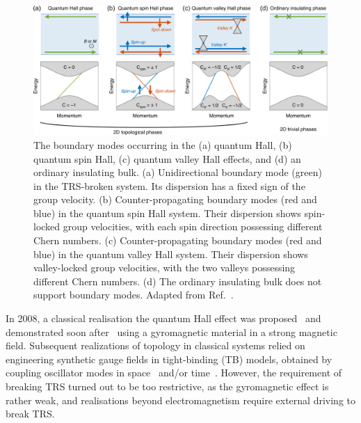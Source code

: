 \begin{figure} [h!]
	\centering
	\includegraphics[width=\textwidth]{figures/intro/topological_phases_edited.png}
	\caption{The boundary modes occurring in the (a) quantum Hall, (b) quantum spin Hall, (c) quantum valley Hall effects, and (d) an ordinary insulating bulk. (a) Unidirectional boundary mode (green) in the TRS-broken system. Its dispersion has a fixed sign of the group velocity. (b) Counter-propagating boundary modes (red and blue) in the quantum spin Hall system. Their dispersion shows spin-locked group velocities, with each spin direction possessing different Chern numbers. (c) Counter-propagating boundary modes (red and blue) in the quantum valley Hall system. Their dispersion shows valley-locked group velocities, with the two valleys possessing different Chern numbers. (d) The ordinary insulating bulk does not support boundary modes. Adapted from Ref.~\cite{Kim_2020}.}
	\label{fig:intro_topo}
\end{figure}

In 2008, a classical realisation the quantum Hall effect was proposed~\cite{Haldane_2008} and demonstrated soon after~\cite{Wang_2008, Wang_2009} using a gyromagnetic material in a strong magnetic field. Subsequent realizations of topology in classical systems relied on engineering synthetic gauge fields in tight-binding (TB) models, obtained by coupling oscillator modes in space~\cite{Kraus_2012, Hafezi_2013} and/or time~\cite{Rechtsman_2013}. However, the requirement of breaking TRS turned out to be too restrictive, as the gyromagnetic effect is rather weak, and realisations beyond electromagnetism require external driving to break TRS. 

